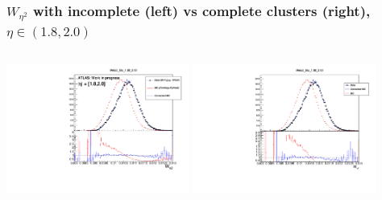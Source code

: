 \documentclass{beamer}
\begin{document}
\begin{frame}
\frametitle{$W_{\eta^2}$  with incomplete  (left) vs complete clusters (right), $\eta \in (1.8, 2.0)$ }

\begin{columns}[t]
\centering
\includegraphics[width=6cm]{Weta2_Eta_18_20.pdf}
\centering
\includegraphics[width=6cm]{Weta2_Eta_18_20_Athena.pdf}
\end{columns}
\end{frame}
\end{document}
